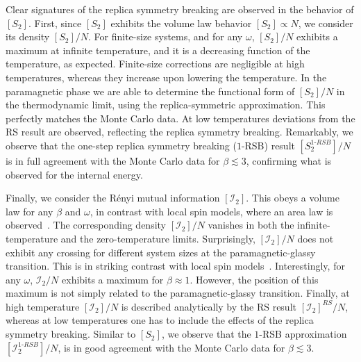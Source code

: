 \documentclass[twocolumn,superscriptaddress,prb,10pt]{revtex4-1}
\begin{document}
Clear signatures of the replica symmetry breaking are observed in the behavior of $[S_2]$. 
First, since $[S_2]$ exhibits the volume law behavior $[S_2]\propto N$, 
we consider its density $[S_2]/N$. For finite-size systems, and for any $\omega$, $[S_2]/N$ 
exhibits a maximum at infinite temperature, and it is a decreasing function of the temperature, 
as expected. Finite-size corrections are negligible at high temperatures, whereas they increase 
upon lowering the temperature. In the paramagnetic phase we are able to determine the functional 
form of $[S_2]/N$ in the thermodynamic limit, using the replica-symmetric approximation. This 
perfectly matches the Monte Carlo data. At low temperatures deviations from the RS result are 
observed, reflecting the replica symmetry breaking. Remarkably, we observe that the one-step 
replica symmetry breaking ($1$-RSB) result $[S_2^{1\textrm{-}RSB}]/N$ is in full agreement with 
the Monte Carlo data for $\beta\lesssim 3$, confirming what is observed for the internal 
energy. 

Finally, we consider the R\'enyi mutual information $[{\mathcal I}_2]$. This obeys a volume 
law for any $\beta$ and $\omega$, in contrast with local spin models, where an area law is 
observed~\cite{wolf-2008}. The corresponding density $[{\mathcal I}_2]/N$ vanishes in 
both the infinite-temperature and the zero-temperature limits. Surprisingly, $[{\mathcal I}_2]/N$ 
does not exhibit any crossing for different system sizes at the paramagnetic-glassy transition.
This is in striking contrast with local spin models~\cite{jaconis-2013}. Interestingly, for 
any $\omega$, ${\mathcal I}_2/N$ exhibits a maximum for $\beta\approx 1$. However, the 
position of this maximum is not simply related to the paramagnetic-glassy transition. Finally, 
at high temperature $[{\mathcal I}_2]/N$ is described analytically by the RS result 
$[{\mathcal I}_2]^{RS}/N$, whereas at low temperatures one has to include the effects of the 
replica symmetry breaking. Similar to $[S_2]$, we observe that the $1$-RSB approximation 
$[{\mathcal I}^{1\textrm{-}RSB}_2]/N$, is in good agreement with the Monte Carlo data 
for $\beta\lesssim 3$.
\end{document}
